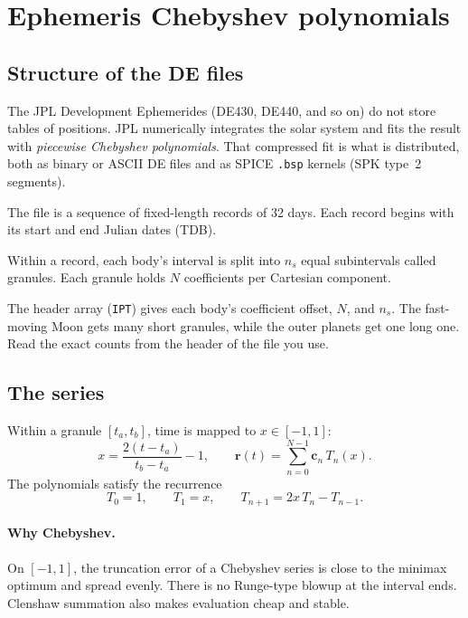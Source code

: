 \documentclass[11pt]{article}
\newcommand{\vr}{\bm{r}}
\begin{document}
\section{Ephemeris Chebyshev polynomials}
\label{sec:cheb}

\subsection{Structure of the DE files}

The JPL Development Ephemerides (DE430, DE440, and so on) do not store tables of positions. JPL numerically integrates the solar system and fits the result with \emph{piecewise Chebyshev polynomials}. That compressed fit is what is distributed, both as binary or ASCII DE files and as SPICE \texttt{.bsp} kernels (SPK type~2 segments).

\begin{description}[style=nextline]
  \item[Records.] The file is a sequence of fixed-length records of 32 days. Each record begins with its start and end Julian dates (TDB).
  \item[Granules.] Within a record, each body's interval is split into $n_s$ equal subintervals called granules. Each granule holds $N$ coefficients per Cartesian component.
  \item[Header array.] The header array (\texttt{IPT}) gives each body's coefficient offset, $N$, and $n_s$. The fast-moving Moon gets many short granules, while the outer planets get one long one. Read the exact counts from the header of the file you use.
\end{description}

\subsection{The series}

Within a granule $[t_a, t_b]$, time is mapped to $x\in[-1,1]$:
\begin{equation}
x = \frac{2(t - t_a)}{t_b - t_a} - 1,\qquad
\vr(t) = \sum_{n=0}^{N-1}\mathbf c_n\,T_n(x).
\end{equation}
The polynomials satisfy the recurrence
\begin{equation}
T_0 = 1,\qquad T_1 = x,\qquad T_{n+1} = 2x\,T_n - T_{n-1}.
\end{equation}

\paragraph{Why Chebyshev.} On $[-1,1]$, the truncation error of a Chebyshev series is close to the minimax optimum and spread evenly. There is no Runge-type blowup at the interval ends. Clenshaw summation also makes evaluation cheap and stable.
\end{document}
